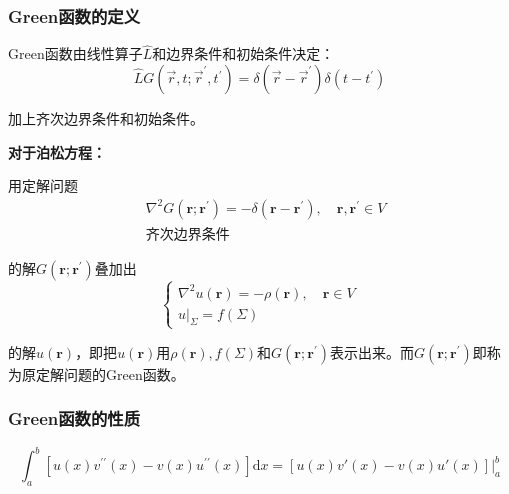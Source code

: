 \subsubsection*{Green函数的定义}
\begin{dfn}[Green函数]
    Green函数由线性算子$\hat{L}$和边界条件和初始条件决定：
    $$\hat{L}G(\vec{r},t;\vec{r}^{\prime},t^{\prime})=\delta(\vec{r}-\vec{r}^{\prime})\delta(t-t^{\prime})$$
    
    加上齐次边界条件和初始条件。
    
    \noindent\textbf{对于泊松方程：}
    
        用定解问题
        $$\boxed{
            \begin{aligned}
                &\nabla^2G(\boldsymbol{r};\boldsymbol{r}^{\prime})=-\delta(\boldsymbol{r}-\boldsymbol{r}^{\prime}),\quad\boldsymbol{r},\boldsymbol{r}^{\prime}\in V\\
                &\text{齐次边界条件}
            \end{aligned}
        }$$
        
        的解$G(\boldsymbol{r};\boldsymbol{r}^{\prime})$叠加出
        $$\begin{cases}
            \nabla^2u(\boldsymbol{r})=-\rho(\boldsymbol{r}),\quad\boldsymbol{r}\in V\\
            \left.u\right|_\Sigma=f(\Sigma)
        \end{cases}$$
        
        的解$u(\boldsymbol{r})$，即把$u(\boldsymbol{r})$用$\rho(\boldsymbol{r}),f(\Sigma)$和$G(\boldsymbol{r};\boldsymbol{r}^{\prime})$表示出来。而$G(\boldsymbol{r};\boldsymbol{r}^{\prime})$即称为原定解问题的Green函数。

\end{dfn}

\subsubsection*{Green函数的性质}

\begin{dfn}[Green公式一维形式]
    $$\boxed{\int_a^b[u(x)v^{\prime\prime}(x)-v(x)u^{\prime\prime}(x)]\mathrm{d}x=[u(x)v'(x)-v(x)u'(x)]|_a^b}$$
\end{dfn}

